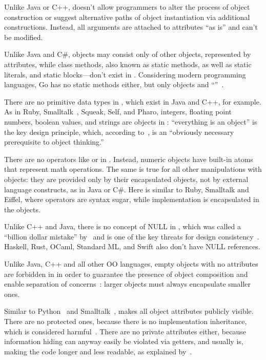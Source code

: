 %
Unlike Java or C++, \eolang{} doesn't allow programmers to alter
the process of object construction or suggest alternative
paths of object instantiation via additional constructions.
Instead, all arguments are attached to attributes ``as is'' and can't be modified.

%
Unlike Java and C\#,
\eolang{} objects may consist only of other objects, represented
by attributes, while class methods, also known as static methods, as well as
static literals, and static blocks---don't exist in \eolang{}.
Considering modern programming languages, Go has no static methods either,
but only objects and ``''~\citep{schmager2010gohotdraw}.

%
There are no primitive data types in \eolang{}, which
exist in Java and C++, for example.
As in Ruby, Smalltalk~\citep*{goldbergrobson1983smalltalk}, Squeak, Self, and Pharo,
integers, floating point numbers, boolean
values, and strings are objects in \eolang{}:
``everything is an object'' is the key design principle, which,
according to~\citet[p.66]{west2004object}, is an ``obviously necessary prerequisite
to object thinking.''

%
There are no operators like \ff{+} or \ff{/} in \eolang{}. Instead,
numeric objects have built-in atoms that represent math operations. The same
is true for all other manipulations with objects: they are provided
only by their encapsulated objects, not by external language constructs, as in
Java or C\#. Here \eolang{} is similar to Ruby, Smalltalk and Eiffel,
where operators are syntax sugar, while implementation is encapsulated in
the objects.

%
Unlike C++ and Java, there is no concept of NULL in \eolang{}, which
was called a ``billion dollar mistake'' by~\citet{hoare2009null} and
is one of the key threats for design consistency~\citep{eo1}.
Haskell, Rust, OCaml, Standard ML, and Swift also don't have NULL references.

%
Unlike Java, C++ and all other OO languages,
empty objects with no attributes are forbidden in \eolang{} in order
to guarantee the presence of object composition and
enable separation of concerns~\citep{dijkstra1982role}:
larger objects must always encapsulate smaller ones.

%
Similar to Python~\citep{lutz2013learning} and Smalltalk~\citep{hunt1997smalltalk},
\eolang{} makes all object attributes publicly visible.
There are no protected ones, because there is no implementation
inheritance, which is considered harmful~\citep{hunt2000}.
There are no private attributes either, because information
hiding can anyway easily be violated via getters, and usually is, making the code longer
and less readable, as explained by~\citet{holub2004more}.

